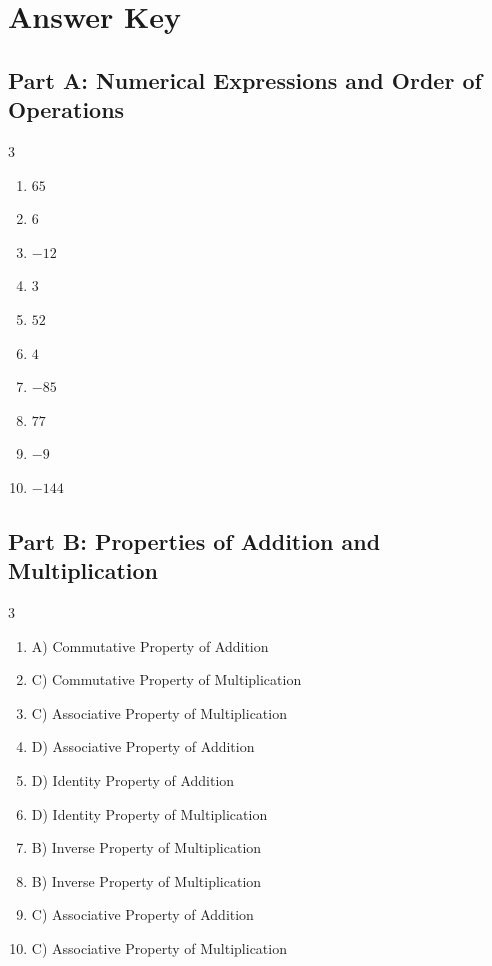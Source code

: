 \documentclass[11pt]{article}
\begin{document}
\newpage
{}
\section*{Answer Key}
\subsection*{Part A: Numerical Expressions and Order of Operations}
\begin{multicols}{3}
\begin{enumerate}
  \item $65$
  \item $6$
  \item $-12$
  \item $3$
  \item $52$
  \item $4$
  \item $-85$
  \item $77$
  \item $-9$
  \item $-144$
\end{enumerate}
\end{multicols}
\subsection*{Part B: Properties of Addition and Multiplication}
\begin{multicols}{3}
\begin{enumerate}
  \item A) Commutative Property of Addition
  \item C) Commutative Property of Multiplication
  \item C) Associative Property of Multiplication
  \item D) Associative Property of Addition
  \item D) Identity Property of Addition
  \item D) Identity Property of Multiplication
  \item B) Inverse Property of Multiplication
  \item B) Inverse Property of Multiplication
  \item C) Associative Property of Addition
  \item C) Associative Property of Multiplication
\end{enumerate}
\end{multicols}
\end{document}

